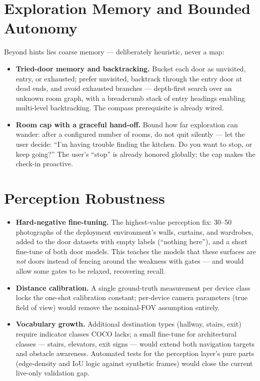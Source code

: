 \section{Exploration Memory and Bounded Autonomy}
\label{sec:fw_memory}

Beyond hints lies coarse memory --- deliberately heuristic, never a map:

\begin{itemize}[nosep]
  \item \textbf{Tried-door memory and backtracking.} Bucket each door as
        unvisited, entry, or exhausted; prefer unvisited, backtrack through the
        entry door at dead ends, and avoid exhausted branches --- depth-first
        search over an unknown room graph, with a breadcrumb stack of entry
        headings enabling multi-level backtracking. The compass prerequisite is
        already wired.
  \item \textbf{Room cap with a graceful hand-off.} Bound how far exploration
        can wander: after a configured number of rooms, do not quit silently ---
        let the user decide: ``I'm having trouble finding the kitchen. Do you
        want to stop, or keep going?'' The user's ``stop'' is already honored
        globally; the cap makes the check-in proactive.
\end{itemize}

\section{Perception Robustness}
\label{sec:fw_perception}

\begin{itemize}[nosep]
  \item \textbf{Hard-negative fine-tuning.} The highest-value perception fix:
        30--50 photographs of the deployment environment's walls, curtains, and
        wardrobes, added to the door datasets with empty labels (``nothing
        here''), and a short fine-tune of both door models. This teaches the
        models that these surfaces are \emph{not} doors instead of fencing
        around the weakness with gates --- and would allow some gates to be
        relaxed, recovering recall.
  \item \textbf{Distance calibration.} A single ground-truth measurement per
        device class locks the one-shot calibration constant; per-device camera
        parameters (true field of view) would remove the nominal-FOV assumption
        entirely.
  \item \textbf{Vocabulary growth.} Additional destination types (hallway,
        stairs, exit) require indicator classes COCO lacks; a small fine-tune
        for architectural classes --- stairs, elevators, exit signs --- would
        extend both navigation targets and obstacle awareness. Automated tests
        for the perception layer's pure parts (edge-density and IoU logic
        against synthetic frames) would close the current live-only validation
        gap.
\end{itemize}

